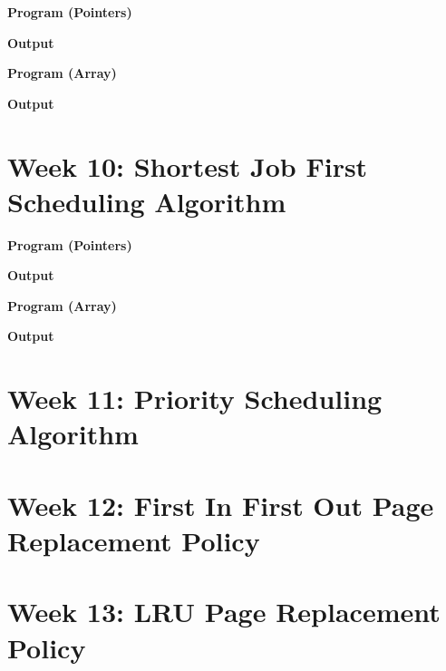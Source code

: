 \documentclass{article}
\begin{document}
\noindent \textbf{\large{Program (Pointers)}}


\noindent \textbf{\large{Output}}


\noindent \textbf{\large{Program (Array)}}


\noindent \textbf{\large{Output}}


\newpage
\section{Week 10: Shortest Job First Scheduling Algorithm}

\noindent \textbf{\large{Program (Pointers)}}


\noindent \textbf{\large{Output}}


\noindent \textbf{\large{Program (Array)}}


\noindent \textbf{\large{Output}}


\newpage
\section{Week 11: Priority Scheduling Algorithm}


\newpage
\section{Week 12: First In First Out Page Replacement Policy}


\newpage
\section{Week 13: LRU Page Replacement Policy}
\end{document}
